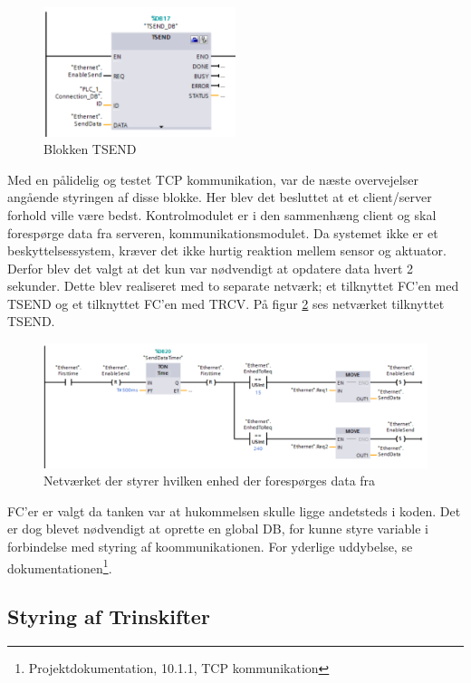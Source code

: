 \begin{figure}[H] %
	\centering
	\includegraphics[width=0.5\textwidth]{Figure/TSEND}
	\caption{Blokken TSEND}
	\label{fig:TSEND}
\end{figure}


Med en pålidelig og testet TCP kommunikation, var de næste overvejelser angående styringen af disse blokke. Her blev det besluttet at et client/server forhold ville være bedst. Kontrolmodulet er i den sammenhæng client og skal forespørge data fra serveren, kommunikationsmodulet.
Da systemet ikke er et beskyttelsessystem, kræver det ikke hurtig reaktion mellem sensor og aktuator. Derfor blev det valgt at det kun var nødvendigt at opdatere data hvert 2 sekunder. Dette blev realiseret med to separate netværk; et tilknyttet FC'en med TSEND og et tilknyttet FC'en med TRCV. På figur \ref{fig:ValgAfEnhedSend} ses netværket tilknyttet TSEND.

\begin{figure}[H] %
	\centering
	\includegraphics[width=1\textwidth]{Figure/valgAfEnhedSend}
	\caption{Netværket der styrer hvilken enhed der forespørges data fra}
	\label{fig:ValgAfEnhedSend}
\end{figure}

FC'er er valgt da tanken var at hukommelsen skulle ligge andetsteds i koden. Det er dog blevet nødvendigt at oprette en global DB, for kunne styre variable i forbindelse med styring af koommunikationen. For yderlige uddybelse, se dokumentationen\footnote{Projektdokumentation, 10.1.1, TCP kommunikation}.

\subsection{Styring af Trinskifter}

